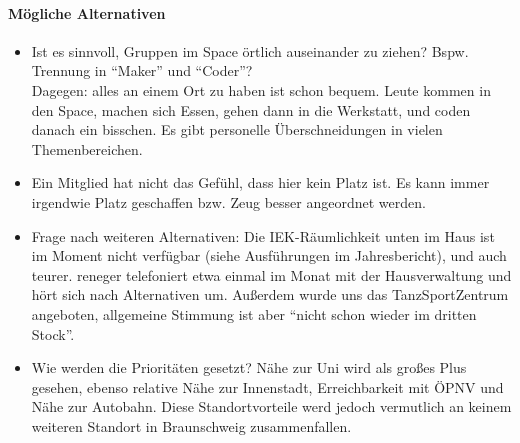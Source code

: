 \documentclass{s0minutes}
\begin{document}
\paragraph{Mögliche Alternativen}
\begin{itemize}
  \item Ist es sinnvoll, Gruppen im Space örtlich auseinander zu ziehen? Bspw.
    Trennung in "`Maker"' und "`Coder"'? \\
    Dagegen: alles an einem Ort zu haben ist schon bequem. Leute kommen in den
    Space, machen sich Essen, gehen dann in die Werkstatt, und coden danach ein
    bisschen. Es gibt personelle Überschneidungen in vielen Themenbereichen.
  \item Ein Mitglied hat nicht das Gefühl, dass hier kein Platz ist. Es kann
    immer irgendwie Platz geschaffen bzw. Zeug besser angeordnet werden.
  \item Frage nach weiteren Alternativen: Die IEK-Räumlichkeit unten im Haus ist
    im Moment nicht verfügbar (siehe Ausführungen im Jahresbericht), und auch
    teurer. reneger telefoniert etwa einmal im Monat mit der Hausverwaltung und
    hört sich nach Alternativen um. Außerdem wurde uns das TanzSportZentrum
    angeboten, allgemeine Stimmung ist aber "`nicht schon wieder im dritten
    Stock"'.
  \item Wie werden die Prioritäten gesetzt? Nähe zur Uni wird als großes Plus
    gesehen, ebenso relative Nähe zur Innenstadt, Erreichbarkeit mit ÖPNV und
    Nähe zur Autobahn. Diese Standortvorteile werd jedoch vermutlich an keinem
    weiteren Standort in Braunschweig zusammenfallen.
\end{itemize}
\end{document}
